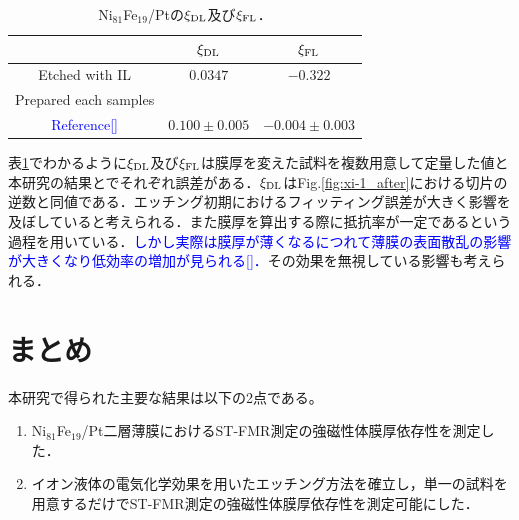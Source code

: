 \begin{table}[hbtp]
  \caption{Ni$_{81}$Fe$_{19}$/Ptの$\xi_{\rm DL}$及び$\xi_{\rm FL}$．}
  \label{table:xi}
  \centering
  \begin{tabular}{ccc}%
    \hline
           &   $\xi_{\rm DL}$   & $\xi_{\rm FL}$  \\
    \hline \hline
   Etched with IL  & $0.0347 $  & $-0.322$\\
   Prepared each samples  &    &  \\
   \textcolor{blue}{Reference[]}  & $0.100\pm 0.005$  & $-0.004\pm 0.003$\\
    \hline
  \end{tabular}
\end{table}


表\ref{table:xi}でわかるように$\xi_{\rm DL}$及び$\xi_{\rm FL}$は膜厚を変えた試料を複数用意して定量した値と本研究の結果とでそれぞれ誤差がある．$\xi_{\rm DL}$はFig.\ref{fig:xi-1_after}における切片の逆数と同値である．エッチング初期におけるフィッティング誤差が大きく影響を及ぼしていると考えられる．また膜厚を算出する際に抵抗率が一定であるという過程を用いている．\textcolor{blue}{しかし実際は膜厚が薄くなるにつれて薄膜の表面散乱の影響が大きくなり低効率の増加が見られる[]．}その効果を無視している影響も考えられる．



\section{まとめ}
本研究で得られた主要な結果は以下の2点である。
\begin{enumerate}
 \item Ni$_{81}$Fe$_{19}$/Pt二層薄膜におけるST-FMR測定の強磁性体膜厚依存性を測定した．
 \item イオン液体の電気化学効果を用いたエッチング方法を確立し，単一の試料を用意するだけでST-FMR測定の強磁性体膜厚依存性を測定可能にした．
\end{enumerate}

